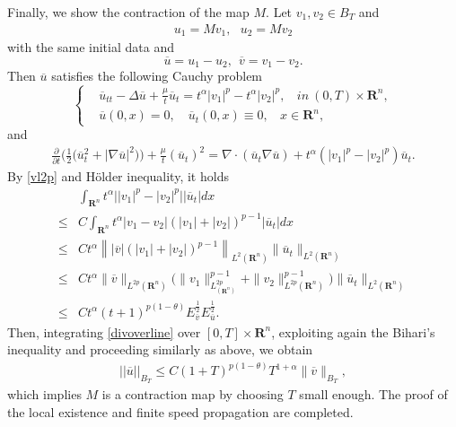 \documentclass[review]{elsarticle}
\newcommand{\R}{\mathbf{R}}
\begin{document}
Finally, we show the contraction of the map $M$. Let $v_1,v_2\in B_{T}$ and
\begin{equation}\label{u1u2}
\begin{aligned}
u_1=Mv_1,~~~u_2=Mv_2
\end{aligned}
\end{equation}
with the same initial data and
\[
\overline{u}=u_1-u_2,~~\overline{v}=v_1-v_2.
\]
Then $\overline{u}$ satisfies the following Cauchy problem
\begin{equation}
\label{repdoverline}
\left\{
\begin{aligned}
& \overline{u}_{tt}-\Delta \overline{u}+\frac{\mu}{t}\overline{u}_t=t^\alpha|v_1|^p-t^\alpha|v_2|^p, ~~~~in~ (0, T)\times\R^n,\\
& \overline{u}(0, x)=0, \quad \overline{u}_t(0, x)\equiv0,~~~~x\in \R^n,
\end{aligned}
\right.
\end{equation}
and
\begin{equation}\label{divoverline}
\begin{aligned}
\frac{\partial}{\partial t}\Bigg(\frac{1}{2}\big(\overline{u}_t^2+|\nabla \overline{u}|^2\big)\Bigg)+\frac{\mu}{t}\left(\overline{u}_t\right)^2=\nabla\cdot
(\overline{u}_t\nabla \overline{u})+t^\alpha(|v_1|^p-|v_2|^p)\overline{u}_t.
\end{aligned}
\end{equation}
By \eqref{vl2p} and H\"{o}lder inequality, it holds
\begin{equation}
\begin{aligned}
&\int_{\R^n}t^\alpha\big||v_1|^p-|v_2|^p\big||\overline{u}_t|dx\\
\leq &C\int_{\R^n}t^\alpha|v_1-v_2|(|v_1|+|v_2|)^{p-1}|\overline{u}_t|dx\\
\leq &Ct^\alpha\left\||\overline{v}|(|v_1|+|v_2|)^{p-1}\right\|_{L^2(\R^n)}
\|\overline{u}_t\|_{L^2(\R^n)}\\
\leq& Ct^\alpha\|\overline{v}\|_{L^{2p}(\R^n)}\Big(\|v_1\|_{L_{(\R^n)}^{2p}}^{p-1}+
\|v_2\|_{L^{2p}(\R^n)}^{p-1}\Big)\|\overline{u}_t\|_{L^2(\R^n)}\\
\leq &C t^\alpha(t+1)^{p(1-\theta)}E_{\overline{v}}^{\frac{1}{2}}E_{\overline{u}}^{\frac{1}{2}}.
\end{aligned}
\end{equation}
Then, integrating \eqref{divoverline} over $[0, T]\times\R^n$, exploiting again the Bihari's inequality and proceeding similarly as above, we obtain
\begin{equation}
\begin{aligned}
||\overline{u}||_{B_{T}}\leq C(1+T)^{p(1-\theta)}T^{1+\alpha}\|\overline{v}\|_{B_{T}},
\end{aligned}
\end{equation}
which implies $M$ is a contraction map by choosing $T$ small enough.
The proof of the local existence and finite speed propagation are completed.
\end{document}
